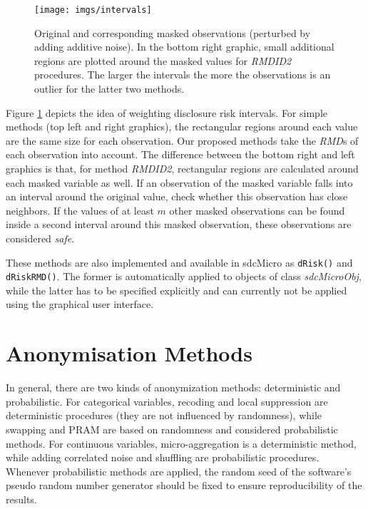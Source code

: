 \documentclass[12pt]{scrartcl}\usepackage[]{graphicx}\usepackage[]{color}
\begin{document}
\begin{figure}[!ht]
\begin{center}
\texttt{[image: imgs/intervals]}
\caption{Original and corresponding masked observations (perturbed by adding additive noise). In the bottom right graphic, small additional regions are plotted around the masked values for \textit{RMDID2} procedures. The larger the intervals the more the observations is an outlier for the latter two methods.}
\label{intervals}
\end{center}
\vspace{-0.4cm}
\end{figure}

Figure \ref{intervals} depicts the idea of weighting disclosure risk intervals. For simple methods (top left and right graphics), the rectangular regions around each value are the same size for each observation. Our proposed methods take the \textit{RMD}s of each observation into account. The difference between the bottom right and left graphics is that, for method \textit{RMDID2}, rectangular regions are calculated around each masked variable as well. If an observation of the masked variable falls into an interval around the original value, check whether this observation has close neighbors. If the values of at least $m$ other masked observations can be found inside a second interval around this masked observation, these observations are considered \textit{safe}.

These methods are also implemented and available in sdcMicro as \lstinline{dRisk()} and \lstinline{dRiskRMD()}. The former is automatically applied to objects of class \textit{sdcMicroObj}, while the latter has to be specified explicitly and can currently not be applied using the graphical user interface.

\section{Anonymisation Methods} \label{sec:methods}
In general, there are two kinds of anonymization methods: deterministic and probabilistic. For categorical variables, recoding and local suppression are deterministic procedures (they are not influenced by randomness), while swapping and PRAM \citep{Gouweleeuw98} are based on randomness and considered probabilistic methods. For continuous variables, micro-aggregation is a deterministic method, while adding correlated noise \citep{Brand04} and shuffling \citep{Muh99} are probabilistic procedures. Whenever probabilistic methods are applied, the random seed of the software's pseudo random number generator should be fixed to ensure reproducibility of the results.
\end{document}
